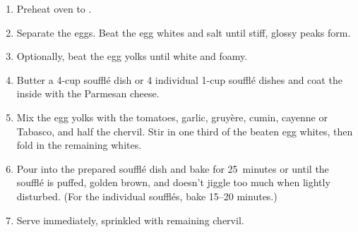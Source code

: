 
\begin{ingredients}
\end{ingredients}


\begin{recipe}
  \begin{enumerate}

  \item Preheat oven to .

  \item Separate the eggs.  Beat the egg whites and salt until stiff,
    glossy peaks form.

  \item Optionally, beat the egg yolks until white and foamy.

  \item Butter a 4-cup souffl\'e dish or 4 individual  1-cup souffl\'e
    dishes and coat the inside with the Parmesan cheese.

  \item Mix the egg yolks with the tomatoes, garlic, gruy\`ere, cumin,
    cayenne or Tabasco, and half the chervil.  Stir in one third of
    the beaten egg whites, then fold in the remaining whites.

  \item Pour into the prepared souffl\'e dish and bake for 25~minutes
    or until the souffl\'e is puffed, golden brown, and doesn't jiggle
    too much when lightly disturbed.  (For the individual souffl\'es,
    bake 15--20 minutes.)

  \item Serve immediately, sprinkled with remaining chervil.

  \end{enumerate}
\end{recipe}
